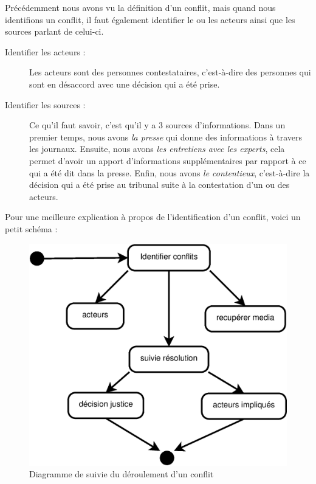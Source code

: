 \documentclass[12pt,a4paper]{article}
\begin{document}
Précédemment nous avons vu la définition d'un conflit, mais quand nous identifions un conflit, il faut également identifier le ou les acteurs ainsi que les sources parlant de celui-ci.

\begin{description}
\item[Identifier les acteurs :] Les acteurs sont des personnes contestataires, c'est-à-dire des personnes qui sont en désaccord avec une décision qui a été prise. 
\item[Identifier les sources :] Ce qu'il faut savoir, c'est qu'il y a 3 sources d'informations. Dans un premier temps, nous avons \textit{la presse} qui donne des informations à travers les journaux. Ensuite, nous avons \textit{les entretiens avec les experts}, cela permet d'avoir un apport d'informations supplémentaires par rapport à ce qui a été dit dans la presse. Enfin, nous avons \textit{le contentieux}, c'est-à-dire la décision qui a été prise au tribunal suite à la contestation d'un ou des acteurs. \newline
\end{description}

Pour une meilleure explication à propos de l'identification d'un conflit, voici un petit schéma :
\begin{figure}[!ht]
\centering
\includegraphics[scale=0.4]{Image/diagrammeConflit.eps}
\caption{Diagramme de suivie du déroulement d'un conflit}
\end{figure}
\end{document}
